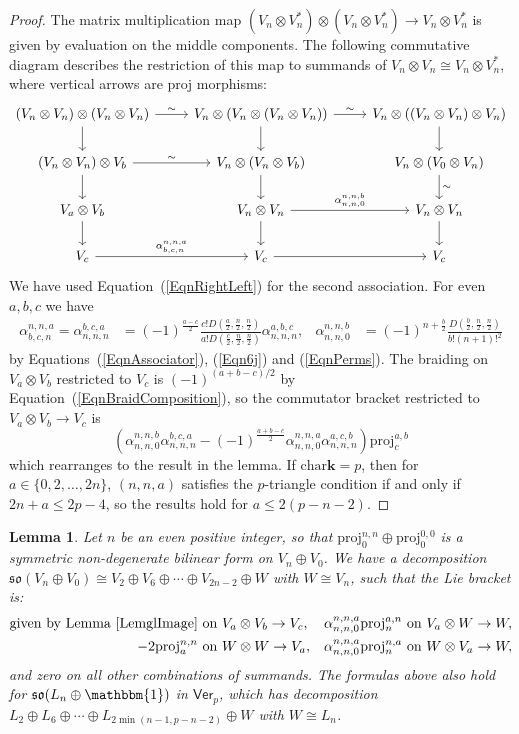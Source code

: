 \documentclass[11pt,a4paper,reqno]{amsart}
\newtheorem{lemma}[theorem]{Lemma}
\theoremstyle{definition}
\newcommand{\bk}{\mathbf{k}}
\numberwithin{equation}{section}
\newcommand{\charr}{\mathrm{char}}
\newcommand{\Ver}{\mathsf{Ver}}
\newcommand{\unit}{{\mathbbm{1}}}
\newcommand{\fso}{\mathfrak{so}}
\newcommand{\proj}{\mathrm{proj}}
\begin{document}
\begin{proof}
The matrix multiplication map $(V_n\otimes V_n^*)\otimes(V_n\otimes V_n^*)\to V_n\otimes V_n^*$ is given by evaluation on the middle components. The following commutative diagram describes the restriction of this map to summands of $V_n\otimes V_n\cong V_n\otimes V_n^*$, where vertical arrows are $\proj$ morphisms:
\[\begin{tikzcd}
(V_n\otimes V_n)\otimes(V_n\otimes V_n) \arrow{d} \arrow{r}{\sim} & V_n\otimes(V_n\otimes(V_n\otimes V_n)) \arrow{d} \arrow{r}{\sim} & V_n\otimes((V_n\otimes V_n)\otimes V_n) \arrow{d}\\
(V_n\otimes V_n)\otimes V_b \arrow{d} \arrow{r}{\sim} & V_n\otimes (V_n\otimes V_b) \arrow{d} & V_n\otimes (V_0\otimes V_n) \arrow{d}{\sim}\\
V_a\otimes V_b \arrow{d} & V_n\otimes V_n \arrow{d} \arrow{r}{\alpha^{n,n,b}_{n,n,0}} & V_n\otimes V_n \arrow{d}\\
V_c \arrow{r}{\alpha^{n,n,a}_{b,c,n}} & V_c \arrow{r} & V_c
\end{tikzcd}\]
We have used Equation~(\ref{EqnRightLeft}) for the second association. For even $a,b,c$ we have
\begin{align*}
\alpha^{n,n,a}_{b,c,n}=\alpha^{b,c,a}_{n,n,n}&=(-1)^{\frac{a-c}2}\frac{c!D(\frac a2,\frac n2,\frac n2)}{a!D(\frac c2,\frac n2,\frac n2)}\alpha^{a,b,c}_{n,n,n},&\alpha^{n,n,b}_{n,n,0}&=(-1)^{n+\frac b2}\frac{D(\frac b2,\frac n2,\frac n2)}{b!(n+1)!^2}
\end{align*}
by Equations~(\ref{EqnAssociator}), (\ref{Eqn6j}) and (\ref{EqnPerms}). The braiding on $V_a\otimes V_b$ restricted to $V_c$ is $(-1)^{(a+b-c)/2}$ by Equation~(\ref{EqnBraidComposition}), so the commutator bracket restricted to $V_a\otimes V_b\to V_c$ is
\[\left(\alpha^{n,n,b}_{n,n,0}\alpha^{b,c,a}_{n,n,n}-(-1)^{\frac{a+b-c}2}\alpha^{n,n,a}_{n,n,0}\alpha^{a,c,b}_{n,n,n}\right)\proj^{a,b}_c\]
which rearranges to the result in the lemma. If $\charr\bk=p$, then for $a\in\{0,2,\dots,2n\}$, $(n,n,a)$ satisfies the $p$-triangle condition if and only if $2n+a\leq 2p-4$, so the results hold for $a\leq 2(p-n-2)$.
\end{proof}

\begin{lemma}\label{LemTypeD}
Let $n$ be an even positive integer, so that $\proj^{n,n}_0\oplus\proj^{0,0}_0$ is a symmetric non-degenerate bilinear form on $V_n\oplus V_0$. We have a decomposition $\fso(V_n\oplus V_0)\cong V_2\oplus V_6\oplus\cdots\oplus V_{2n-2}\oplus W$ with $W\cong V_n$, such that the Lie bracket is:
\begin{align*}
\text{given by Lemma~\ref{LemglImage} on }&V_a\otimes V_b\to V_c, & \alpha^{n,n,a}_{n,n,0}\proj^{a,n}_n\text{ on }&V_a\otimes W\to W,\\
-2\proj^{n,n}_a\text{ on }&W\otimes W\to V_a, & \alpha^{n,n,a}_{n,n,0}\proj^{n,a}_n\text{ on }&W\otimes V_a\to W,
\end{align*}
and zero on all other combinations of summands. The formulas above also hold for $\fso(L_n\oplus\unit)$ in $\Ver_p$, which has decomposition $L_2\oplus L_6\oplus\cdots\oplus L_{2\min(n-1,p-n-2)}\oplus W$ with $W\cong L_n$.
\end{lemma}
\end{document}
